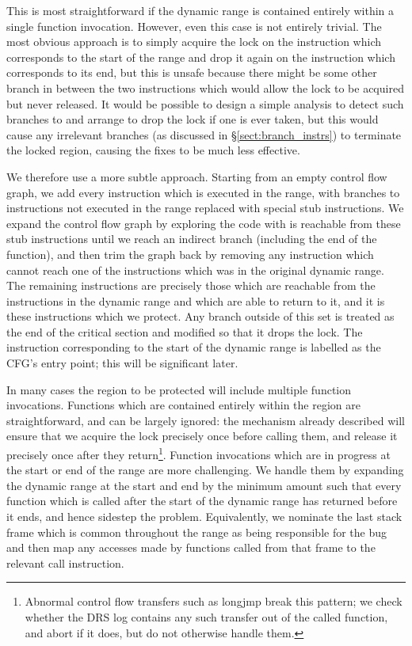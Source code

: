\documentclass[10pt,letter,twocolumn]{sigplanconf}
\begin{document}
This is most straightforward if the dynamic range is contained
entirely within a single function invocation.  However, even this case
is not entirely trivial.  The most obvious approach is to simply
acquire the lock on the instruction which corresponds to the start of
the range and drop it again on the instruction which corresponds to
its end, but this is unsafe because there might be some other branch
in between the two instructions which would allow the lock to be
acquired but never released.  It would be possible to design a simple
analysis to detect such branches to and arrange to drop the lock if
one is ever taken, but this would cause any irrelevant branches (as
discussed in \S\ref{sect:branch_instrs}) to terminate the locked
region, causing the fixes to be much less effective.

We therefore use a more subtle approach.  Starting from an empty
control flow graph, we add every instruction which is executed in the
range, with branches to instructions not executed in the range
replaced with special stub instructions.  We expand the control flow
graph by exploring the code with is reachable from these stub
instructions until we reach an indirect branch (including the end of
the function), and then trim the graph back by removing any
instruction which cannot reach one of the instructions which was in
the original dynamic range.  The remaining instructions are precisely
those which are reachable from the instructions in the dynamic range
and which are able to return to it, and it is these instructions which
we protect.  Any branch outside of this set is treated as the end of
the critical section and modified so that it drops the lock.  The
instruction corresponding to the start of the dynamic range is
labelled as the CFG's entry point; this will be significant later.

In many cases the region to be protected will include multiple
function invocations.  Functions which are contained entirely within
the region are straightforward, and can be largely ignored: the
mechanism already described will ensure that we acquire the lock
precisely once before calling them, and release it precisely once
after they return\footnote{Abnormal control flow transfers such as
  longjmp break this pattern; we check whether the DRS log contains
  any such transfer out of the called function, and abort if it does,
  but do not otherwise handle them.}.  Function invocations which are
in progress at the start or end of the range are more challenging.  We
handle them by expanding the dynamic range at the start and end by the
minimum amount such that every function which is called after the
start of the dynamic range has returned before it ends, and hence
sidestep the problem.  Equivalently, we nominate the last stack frame
which is common throughout the range as being responsible for the bug
and then map any accesses made by functions called from that frame to
the relevant call instruction.
\end{document}
